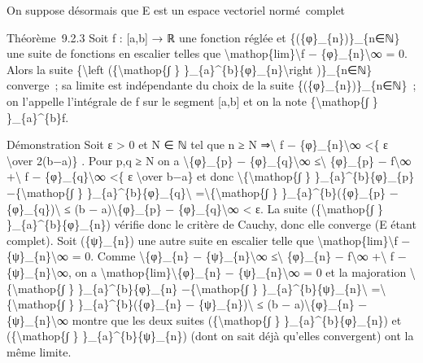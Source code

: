 \documentclass[]{article}
\begin{document}
On suppose désormais que E est un espace vectoriel normé~complet

Théorème~9.2.3 Soit f : {[}a,b{]} → ℝ une fonction réglée et
\{(\{φ\}\_\{n\})\}\_\{n∈ℕ\} une suite de fonctions en escalier telles
que \textbackslash{}mathop\{lim\}\textbackslash{}\textbar{}f −
\{φ\}\_\{n\}\textbackslash{}\textbar{}∞ = 0. Alors la suite
\{\textbackslash{}left (\{\textbackslash{}mathop\{∫ \}
\}\_\{a\}\^{}\{b\}\{φ\}\_\{n\}\textbackslash{}right )\}\_\{n∈ℕ\}
converge~; sa limite est indépendante du choix de la suite
\{(\{φ\}\_\{n\})\}\_\{n∈ℕ\}~; on l'appelle l'intégrale de f sur le
segment {[}a,b{]} et on la note \{\textbackslash{}mathop\{∫ \}
\}\_\{a\}\^{}\{b\}f.

Démonstration Soit ε \textgreater{} 0 et N ∈ ℕ tel que n ≥ N
⇒\textbackslash{}\textbar{} f − \{φ\}\_\{n\}\textbackslash{}\textbar{}∞
\textless{}\{ ε \textbackslash{}over 2(b−a)\} . Pour p,q ≥ N on a
\textbackslash{}\textbar{}\{φ\}\_\{p\} −
\{φ\}\_\{q\}\textbackslash{}\textbar{}∞ ≤\textbackslash{}\textbar{}
\{φ\}\_\{p\} − f\textbackslash{}\textbar{}∞ +\textbackslash{}\textbar{}
f − \{φ\}\_\{q\}\textbackslash{}\textbar{}∞ \textless{}\{ ε
\textbackslash{}over b−a\} et donc
\textbackslash{}\textbar{}\{\textbackslash{}mathop\{∫ \}
\}\_\{a\}\^{}\{b\}\{φ\}\_\{p\} −\{\textbackslash{}mathop\{∫ \}
\}\_\{a\}\^{}\{b\}\{φ\}\_\{q\}\textbackslash{}\textbar{}
=\textbackslash{}\textbar{}\{\textbackslash{}mathop\{∫ \}
\}\_\{a\}\^{}\{b\}(\{φ\}\_\{p\} −
\{φ\}\_\{q\})\textbackslash{}\textbar{} ≤ (b −
a)\textbackslash{}\textbar{}\{φ\}\_\{p\} −
\{φ\}\_\{q\}\textbackslash{}\textbar{}∞ \textless{} ε. La suite
(\{\textbackslash{}mathop\{∫ \} \}\_\{a\}\^{}\{b\}\{φ\}\_\{n\}) vérifie
donc le critère de Cauchy, donc elle converge (E étant complet). Soit
(\{ψ\}\_\{n\}) une autre suite en escalier telle que
\textbackslash{}mathop\{lim\}\textbackslash{}\textbar{}f −
\{ψ\}\_\{n\}\textbackslash{}\textbar{}∞ = 0. Comme
\textbackslash{}\textbar{}\{φ\}\_\{n\} −
\{ψ\}\_\{n\}\textbackslash{}\textbar{}∞ ≤\textbackslash{}\textbar{}
\{φ\}\_\{n\} − f\textbackslash{}\textbar{}∞ +\textbackslash{}\textbar{}
f − \{ψ\}\_\{n\}\textbackslash{}\textbar{}∞, on a
\textbackslash{}mathop\{lim\}\textbackslash{}\textbar{}\{φ\}\_\{n\} −
\{ψ\}\_\{n\}\textbackslash{}\textbar{}∞ = 0 et la majoration
\textbackslash{}\textbar{}\{\textbackslash{}mathop\{∫ \}
\}\_\{a\}\^{}\{b\}\{φ\}\_\{n\} −\{\textbackslash{}mathop\{∫ \}
\}\_\{a\}\^{}\{b\}\{ψ\}\_\{n\}\textbackslash{}\textbar{}
=\textbackslash{}\textbar{}\{\textbackslash{}mathop\{∫ \}
\}\_\{a\}\^{}\{b\}(\{φ\}\_\{n\} −
\{ψ\}\_\{n\})\textbackslash{}\textbar{} ≤ (b −
a)\textbackslash{}\textbar{}\{φ\}\_\{n\} −
\{ψ\}\_\{n\}\textbackslash{}\textbar{}∞ montre que les deux suites
(\{\textbackslash{}mathop\{∫ \} \}\_\{a\}\^{}\{b\}\{φ\}\_\{n\}) et
(\{\textbackslash{}mathop\{∫ \} \}\_\{a\}\^{}\{b\}\{ψ\}\_\{n\}) (dont on
sait déjà qu'elles convergent) ont la même limite.
\end{document}
